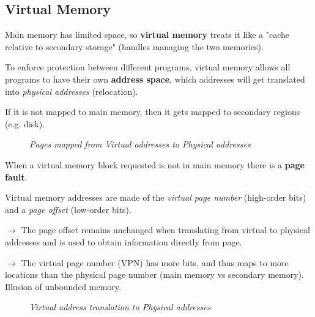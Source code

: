 \documentclass[11pt]{article}
\begin{document}
\subsection*{Virtual Memory}

Main memory has limited space, so \textbf{virtual memory} treats it like a "cache relative to secondary storage" (handles managing the two memories).

To enforce protection between different programs, virtual memory allows all programs to have their own \textbf{address space}, which addresses will get translated into \textit{physical addresses} (relocation).

If it is not mapped to main memory, then it gets mapped to secondary regions (e.g. disk).

\begin{figure}[htbp]
    \centering
    \caption{\textit{Pages mapped from Virtual addresses to Physical addresses}}
\end{figure}

When a virtual memory block requested is not in main memory there is a \textbf{page fault}.

Virtual memory addresses are made of the \textit{virtual page number} (high-order bits) and a \textit{page offset} (low-order bits).

$\rightarrow$ The page offset remains unchanged when translating from virtual to physical addresses and is used to obtain information directly from page.

$\rightarrow$ The virtual page number (VPN) has more bits, and thus maps to more locations than the physical page number (main memory vs secondary memory). Illusion of unbounded memory.

\begin{figure}[htbp]
    \centering
    \caption{\textit{Virtual address translation to Physical addresses}}
\end{figure}
\end{document}
